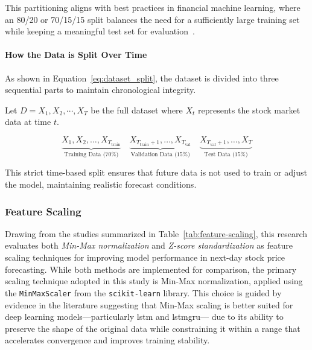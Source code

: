 This partitioning aligns with best practices in financial machine learning, 
where an 80/20 or 70/15/15 split balances the need for a sufficiently large 
training set while keeping a meaningful test set for 
evaluation~\parencite{chang2024StockPrediction}.

\paragraph{How the Data is Split Over Time}
As shown in Equation~\ref{eq:dataset_split}, the dataset is divided into three sequential parts to maintain chronological integrity.

Let $D={X_1,X_2,\cdots,X_T}$ be the full dataset where $X_t$ represents the stock market data at time $t$. 

\begin{equation}
\label{eq:dataset_split}
    \underbrace{X_1, X_2, \dots, X_{T_{\text{train}}}}_{\text{Training Data (70\%)}} \quad
    \underbrace{X_{T_{\text{train}}+1}, \dots, X_{T_{\text{val}}}}_{\text{Validation Data (15\%)}} \quad
    \underbrace{X_{T_{\text{val}}+1}, \dots, X_T}_{\text{Test Data (15\%)}} 
\end{equation}

This strict time-based split ensures that future data is not used to train or adjust the model, maintaining realistic forecast conditions\parencite{guo2024LSTMStock}.

\subsubsection{Feature Scaling}

Drawing from the studies summarized in Table~\ref{tab:feature-scaling}, this research evaluates both 
\emph{Min-Max normalization} and \emph{Z-score standardization} as feature scaling techniques for improving 
model performance in next-day stock price forecasting. While both methods are implemented for comparison, the 
primary scaling technique adopted in this study is Min-Max normalization, applied using the \texttt{MinMaxScaler} 
from the \texttt{scikit-learn} library. This choice is guided by evidence in the literature suggesting that 
Min-Max scaling is better suited for deep learning models—particularly \acrshort{lstm} and \acrshort{lstmgru}—
due to its ability to preserve the shape of the original data while constraining it within a range that accelerates 
convergence and improves training stability.

